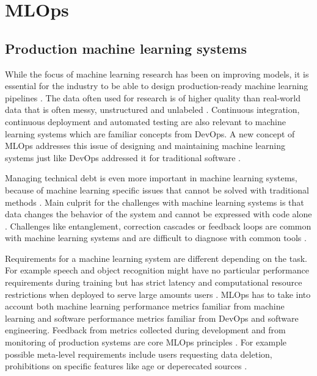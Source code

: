 \section{MLOps} %
\label{sec:mldevops}

\subsection{Production machine learning systems }

While the focus of machine learning research has been on improving models, it is essential for the industry to be able to design production-ready machine learning pipelines \parencite{posoldovaMachineLearningPipelines2020}. The data often used for research is of higher quality than real-world data that is often messy, unstructured and unlabeled \parencite{posoldovaMachineLearningPipelines2020}. Continuous integration, continuous deployment and automated testing are also relevant to machine learning systems \parencite{posoldovaMachineLearningPipelines2020} which are familiar concepts from DevOps. A new concept of MLOps addresses this issue of designing and maintaining machine learning systems just like DevOps addressed it for traditional software \parencite{kreuzbergerMachineLearningOperations2023}.

Managing technical debt is even more important in machine learning systems, because of machine learning specific issues that cannot be solved with traditional methods \parencite{sculleyHiddenTechnicalDebt2015a}. Main culprit for the challenges with machine learning systems is that data changes the behavior of the system and cannot be expressed with code alone \parencite{sculleyHiddenTechnicalDebt2015a}. Challenges like entanglement, correction cascades or feedback loops are common with machine learning systems and are difficult to diagnose with common tools \parencite{sculleyHiddenTechnicalDebt2015a}.

Requirements for a machine learning system are different depending on the task. For example speech and object recognition might have no particular performance requirements during training but has strict latency and computational resource restrictions when deployed to serve large amounts users \parencite{hintonDistillingKnowledgeNeural2015}. MLOps has to take into account both machine learning performance metrics familiar from machine learning and software performance metrics familiar from DevOps and software engineering. Feedback from metrics collected during development and from monitoring of production systems are core MLOps principles \parencite{kreuzbergerMachineLearningOperations2023}. For example possible meta-level requirements include users requesting data deletion, prohibitions on specific features like age or deperecated sources \parencite{breckMLTestScore2017a}.

